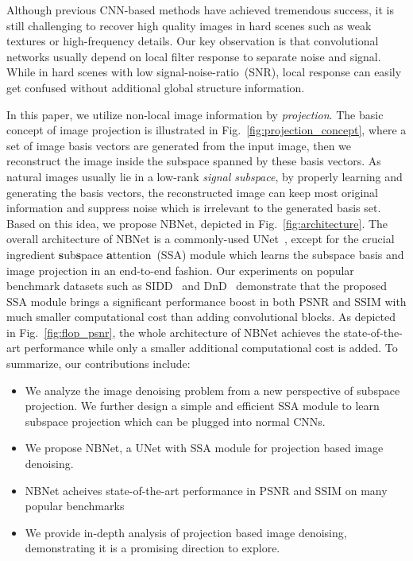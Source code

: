 \documentclass[final]{cvpr}
\begin{document}
Although previous CNN-based methods have achieved tremendous success, it is still challenging to recover high quality images in hard scenes such as weak textures or high-frequency details. Our key observation is that convolutional networks usually depend on local filter response to separate noise and signal. While in hard scenes with low signal-noise-ratio~(SNR), local response can easily get confused without additional global structure information. 

In this paper, we utilize non-local image information by \emph{projection}. The basic concept of image projection is illustrated in Fig.~\ref{fig:projection_concept}, where a set of image basis vectors are generated from the input image, then we reconstruct the image inside the subspace spanned by these basis vectors. As natural images usually lie in a low-rank \emph{signal subspace}, by properly learning and generating the basis vectors, the reconstructed image can keep most original information and suppress noise which is irrelevant to the generated basis set. 
Based on this idea, we propose NBNet, depicted in Fig.~\ref{fig:architecture}. The overall architecture of NBNet is a commonly-used UNet~\cite{ronneberger2015u}, except for the crucial ingredient \textbf{s}ub\textbf{s}pace \textbf{a}ttention~(SSA) module which learns the subspace basis and image projection in an end-to-end fashion. Our experiments on popular benchmark datasets such as SIDD~\cite{abdelhamed2018high} and DnD~\cite{plotz2017benchmarking} demonstrate that the proposed SSA module brings a significant performance boost in both PSNR and SSIM with much smaller computational cost than adding convolutional blocks. As depicted in Fig.~\ref{fig:flop_psnr}, the whole architecture of NBNet achieves the state-of-the-art performance while only a smaller additional computational cost is added. To summarize, our contributions include:
\begin{itemize}
\item We analyze the image denoising problem from a new perspective of subspace projection. We further design a simple and efficient SSA module to learn subspace projection which can be plugged into normal CNNs.
\item We propose NBNet, a UNet with SSA module for projection based image denoising. 

\item NBNet acheives state-of-the-art performance in PSNR and SSIM on many popular benchmarks
\item We provide in-depth analysis of projection based image denoising,  demonstrating it is a promising direction to explore. \end{itemize}
\end{document}
